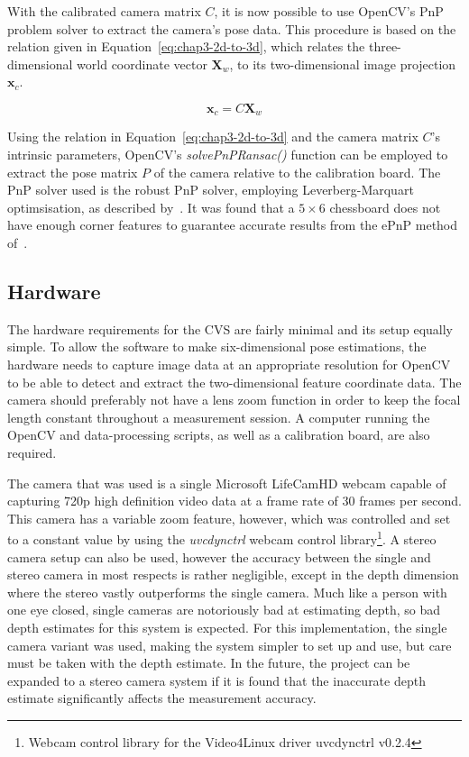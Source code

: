 With the calibrated camera matrix $C$, it is now possible to use OpenCV's PnP problem solver to extract the camera's pose data. This procedure is based on the relation given in Equation~\ref{eq:chap3-2d-to-3d}, which relates the three-dimensional world coordinate vector $\bm{X}_w$, to its two-dimensional image projection $\bm{x}_c$.  

\begin{equation}
   \label{eq:chap3-2d-to-3d}
   \bm{x}_c
   = C
   \bm{X}_w
\end{equation}

Using the relation in Equation~\ref{eq:chap3-2d-to-3d} and the camera matrix $C$'s intrinsic parameters, OpenCV's \emph{solvePnPRansac()} function can be employed to extract the pose matrix $P$ of the camera relative to the calibration board. The PnP solver used is the robust PnP solver, employing Leverberg-Marquart optimsisation, as described by~\cite{schweighofer2006robust}. It was found that a $5\times6$ chessboard does not have enough corner features to guarantee accurate results from the ePnP method of~\cite{lepetit2009epnp}.

\subsection{Hardware}

The hardware requirements for the CVS are fairly minimal and its setup equally simple. To allow the software to make six-dimensional pose estimations, the hardware needs to capture image data at an appropriate resolution for OpenCV to be able to detect and extract the two-dimensional feature coordinate data. The camera should preferably not have a lens zoom function in order to keep the focal length constant throughout a measurement session. A computer running the OpenCV and data-processing scripts, as well as a calibration board, are also required. 

The camera that was used is a single Microsoft LifeCamHD webcam capable of capturing 720p high definition video data at a frame rate of 30 frames per second. This camera has a variable zoom feature, however, which was controlled and set to a constant value by using the \emph{uvcdynctrl} webcam control library\footnote{Webcam control library for the Video4Linux driver uvcdynctrl v0.2.4}. A stereo camera setup can also be used, however the accuracy between the single and stereo camera in most respects is rather negligible, except in the depth dimension where the stereo vastly outperforms the single camera. Much like a person with one eye closed, single cameras are notoriously bad at estimating depth, so bad depth estimates for this system is expected. For this implementation, the single camera variant was used, making the system simpler to set up and use, but care must be taken with the depth estimate. In the future, the project can be expanded to a stereo camera system if it is found that the inaccurate depth estimate significantly affects the measurement accuracy.

